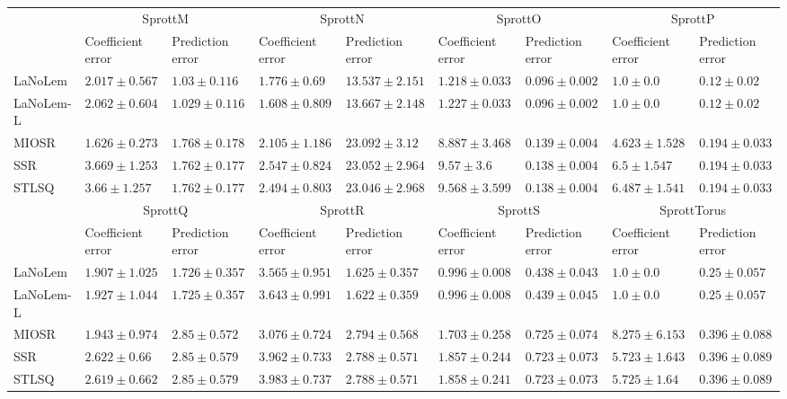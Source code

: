 \begin{table*}
{\begin{tabular}{lllllllll}
\midrule

 & \multicolumn{2}{c}{SprottM} & \multicolumn{2}{c}{SprottN} & \multicolumn{2}{c}{SprottO} & \multicolumn{2}{c}{SprottP} \\
 & Coefficient error & Prediction error & Coefficient error & Prediction error & Coefficient error & Prediction error & Coefficient error & Prediction error \\
\midrule
LaNoLem & $2.017\pm 0.567$ & $1.03\pm 0.116$ & $1.776\pm 0.69$ & $\mathbf{13.537}\pm 2.151$ & $\mathbf{1.218}\pm 0.033$ & $0.096\pm 0.002$ & $\mathbf{1.0}\pm 0.0$ & $0.12\pm 0.02$ \\
LaNoLem-L & $2.062\pm 0.604$ & $\mathbf{1.029}\pm 0.116$ & $\mathbf{1.608}\pm 0.809$ & $13.667\pm 2.148$ & $1.227\pm 0.033$ & $\mathbf{0.096}\pm 0.002$ & $\mathbf{1.0}\pm 0.0$ & $\mathbf{0.12}\pm 0.02$ \\
MIOSR & $\mathbf{1.626}\pm 0.273$ & $1.768\pm 0.178$ & $2.105\pm 1.186$ & $23.092\pm 3.12$ & $8.887\pm 3.468$ & $0.139\pm 0.004$ & $4.623\pm 1.528$ & $0.194\pm 0.033$ \\
SSR & $3.669\pm 1.253$ & $1.762\pm 0.177$ & $2.547\pm 0.824$ & $23.052\pm 2.964$ & $9.57\pm 3.6$ & $0.138\pm 0.004$ & $6.5\pm 1.547$ & $0.194\pm 0.033$ \\
STLSQ & $3.66\pm 1.257$ & $1.762\pm 0.177$ & $2.494\pm 0.803$ & $23.046\pm 2.968$ & $9.568\pm 3.599$ & $0.138\pm 0.004$ & $6.487\pm 1.541$ & $0.194\pm 0.033$ \\

\midrule

 & \multicolumn{2}{c}{SprottQ} & \multicolumn{2}{c}{SprottR} & \multicolumn{2}{c}{SprottS} & \multicolumn{2}{c}{SprottTorus} \\
 & Coefficient error & Prediction error & Coefficient error & Prediction error & Coefficient error & Prediction error & Coefficient error & Prediction error \\
\midrule
LaNoLem & $\mathbf{1.907}\pm 1.025$ & $1.726\pm 0.357$ & $3.565\pm 0.951$ & $1.625\pm 0.357$ & $0.996\pm 0.008$ & $\mathbf{0.438}\pm 0.043$ & $\mathbf{1.0}\pm 0.0$ & $0.25\pm 0.057$ \\
LaNoLem-L & $1.927\pm 1.044$ & $\mathbf{1.725}\pm 0.357$ & $3.643\pm 0.991$ & $\mathbf{1.622}\pm 0.359$ & $\mathbf{0.996}\pm 0.008$ & $0.439\pm 0.045$ & $\mathbf{1.0}\pm 0.0$ & $\mathbf{0.25}\pm 0.057$ \\
MIOSR & $1.943\pm 0.974$ & $2.85\pm 0.572$ & $\mathbf{3.076}\pm 0.724$ & $2.794\pm 0.568$ & $1.703\pm 0.258$ & $0.725\pm 0.074$ & $8.275\pm 6.153$ & $0.396\pm 0.088$ \\
SSR & $2.622\pm 0.66$ & $2.85\pm 0.579$ & $3.962\pm 0.733$ & $2.788\pm 0.571$ & $1.857\pm 0.244$ & $0.723\pm 0.073$ & $5.723\pm 1.643$ & $0.396\pm 0.089$ \\
STLSQ & $2.619\pm 0.662$ & $2.85\pm 0.579$ & $3.983\pm 0.737$ & $2.788\pm 0.571$ & $1.858\pm 0.241$ & $0.723\pm 0.073$ & $5.725\pm 1.64$ & $0.396\pm 0.089$ \\


\end{tabular}}
\end{table*}
